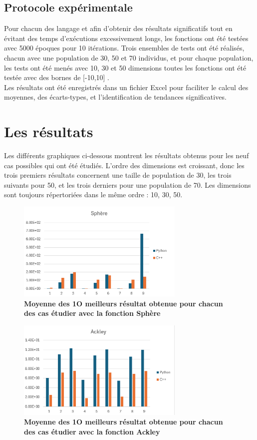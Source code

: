 \documentclass[conference]{IEEEtran}
\begin{document}
\subsection{Protocole expérimentale}
Pour chacun des langage et afin d'obtenir des résultats significatifs tout en évitant des temps d'exécutions excessivement longs, les fonctions ont été testées avec 5000 époques pour 10 itérations. Trois ensembles de tests ont été réalisés, chacun avec une population de 30, 50 et 70 individus, et pour chaque population, les tests ont été menés avec 10, 30 et 50 dimensions toutes les fonctions ont été testée avec des bornes de [-10,10] .\\
Les résultats ont été enregistrés dans un fichier Excel pour faciliter le calcul des moyennes, des écarts-types, et l'identification de tendances significatives.


\section{Les résultats}

Les différents graphiques ci-dessous montrent les résultats obtenus pour les neuf cas possibles qui ont été étudiés. L'ordre des dimensions est croissant, donc les trois premiers résultats concernent une taille de population de 30, les trois suivants pour 50, et les trois derniers pour une population de 70. Les dimensions sont toujours répertoriées dans le même ordre : 10, 30, 50.

\begin{figure}[H]
  \centering
  \includegraphics[width=8cm]{Sphere.png}
  \caption{\textbf{Moyenne des 1O meilleurs résultat obtenue pour chacun des cas étudier avec la fonction Sphère} }
  \label{fig:enter-label}
\end{figure}

\begin{figure}[H]
  \centering
  \includegraphics[width=8cm]{Ackley.png}
  \caption{\textbf{Moyenne des 1O meilleurs résultat obtenue pour chacun des cas étudier avec la fonction Ackley}}
  \label{fig:enter-label}
\end{figure}
\end{document}
